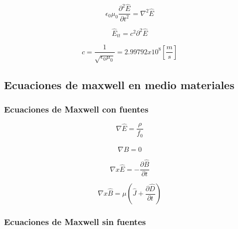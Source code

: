 \documentclass[]{article}
\begin{document}
\begin{equation}
\epsilon_0 \mu_0 \frac{\partial^2 \hat{E}}{\partial t^2}=\nabla^2\hat{E}
\end{equation}

\begin{equation}
\hat{E}_{tt}=c^2 \partial^2 \hat{E}
\end{equation}

\begin{equation}
c=\frac{1}{\sqrt{\epsilon_0 \mu_0}}=2.99792x10^8 [\frac{m}{s}]
\end{equation}

\subsection{Ecuaciones de maxwell en medio materiales}


\subsubsection{Ecuaciones de Maxwell con fuentes}

\begin{equation}
\nabla \hat{E}=\frac{\rho}{f_0}
\end{equation}

\begin{equation}
\nabla \hat{B}=0
\end{equation}

\begin{equation}
\nabla x \hat{E}=-\frac{\partial \hat{B}}{\partial t}
\end{equation}

\begin{equation}
\nabla x \hat{B}=\mu (\hat{J}+\frac{\partial \hat{D}}{\partial t})
\end{equation}






\subsubsection{Ecuaciones de Maxwell sin fuentes}
\end{document}
